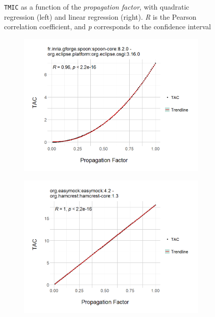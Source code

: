 \begin{figure}[ht!]
\begin{center}
\begin{subfigure}[b]{0.48\textwidth}
  \end{subfigure}
\caption{\texttt{TMIC} as a function of the \textit{propagation factor}, with quadratic regression (left) and linear regression (right). \textit{R} is the Pearson correlation coefficient, and \textit{p} corresponds to the confidence interval}
\label{fig:correlation-tmic}
\end{center}
\end{figure}

\begin{figure}[ht!]
\begin{center}
  \begin{subfigure}[b]{0.48\textwidth}
    \includegraphics[width=\textwidth]{figures/results/Rplot_spoon-core_eclipse-osgi_TAC.png}
  \end{subfigure}
  \begin{subfigure}[b]{0.48\textwidth}
    \includegraphics[width=\textwidth]{figures/results/Rplot_easymock_hamcrest_TAC.png}

\end{subfigure}
\end{center}
\end{figure}
